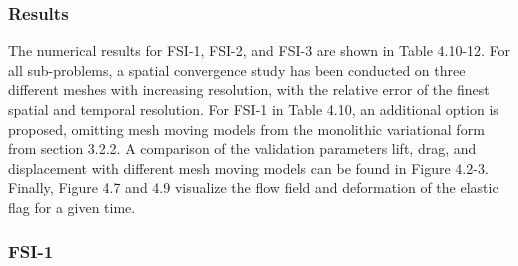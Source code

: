 \subsubsection*{Results}
The numerical results for FSI-1, FSI-2, and FSI-3  are shown in Table 4.10-12. For all sub-problems, a spatial convergence study has been conducted on three different meshes with increasing resolution, with the relative error of the finest spatial and temporal resolution. For FSI-1 in Table 4.10, an additional option is proposed, omitting mesh moving models from the monolithic variational form from section 3.2.2.  A comparison of the validation parameters lift, drag, and displacement with different mesh moving models can be found in Figure 4.2-3. Finally, Figure 4.7 and 4.9 visualize the flow field and deformation of the elastic flag for a given time.
 
 \newpage
\subsubsection{FSI-1}

